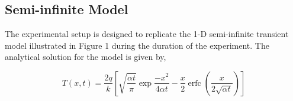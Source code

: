 \documentclass[12pt]{report}
\DeclareMathOperator{\erfc}{erfc}
\begin{document}
\subsection*{Semi-infinite Model}

The experimental setup is designed to replicate the 1-D semi-infinite transient model illustrated in Figure 1 during the duration of the experiment. The analytical solution for the model is given by,

\begin{equation}

T(x,t) = \frac{2q}{k}\left[\sqrt{\frac{\alpha t}{\pi}}\exp{\frac{-x^2}{4 \alpha t}} - \frac{x}{2}\erfc{(\frac{x}{2 \sqrt{\alpha t}})}\right]

\end{equation}
\end{document}
